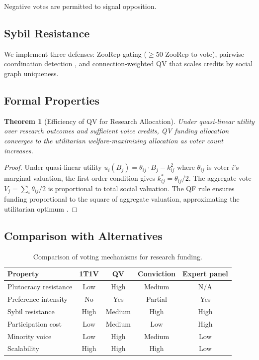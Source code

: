 \documentclass[11pt,a4paper]{article}
\newtheorem{theorem}{Theorem}
\begin{document}
Negative votes are permitted to signal opposition.

\subsection{Sybil Resistance}

We implement three defenses: ZooRep gating ($\geq$50 ZooRep to vote),
pairwise coordination detection \citep{buterin2019flexible}, and
connection-weighted QV that scales credits by social graph uniqueness.

\subsection{Formal Properties}

\begin{theorem}[Efficiency of QV for Research Allocation]
Under quasi-linear utility over research outcomes and sufficient voice
credits, QV funding allocation converges to the utilitarian
welfare-maximizing allocation as voter count increases.
\end{theorem}

\begin{proof}
Under quasi-linear utility $u_i(B_j) = \theta_{ij} \cdot B_j -
k_{ij}^2$ where $\theta_{ij}$ is voter $i$'s marginal valuation, the
first-order condition gives $k_{ij}^* = \theta_{ij} / 2$. The aggregate
vote $V_j = \sum_i \theta_{ij} / 2$ is proportional to total social
valuation. The QF rule ensures funding proportional to the square of
aggregate valuation, approximating the utilitarian optimum
\citep{lalley2018quadratic}.
\end{proof}

\subsection{Comparison with Alternatives}

\begin{table}[H]
\centering
\caption{Comparison of voting mechanisms for research funding.}
\label{tab:voting}
\begin{tabular}{p{3cm}cccc}
\toprule
\textbf{Property} & \textbf{1T1V} & \textbf{QV} &
  \textbf{Conviction} & \textbf{Expert panel} \\
\midrule
Plutocracy resistance & Low & High & Medium & N/A \\
Preference intensity & No & Yes & Partial & Yes \\
Sybil resistance & High & Medium & High & High \\
Participation cost & Low & Medium & Low & High \\
Minority voice & Low & High & Medium & Low \\
Scalability & High & High & High & Low \\
\bottomrule
\end{tabular}
\end{table}
\end{document}
